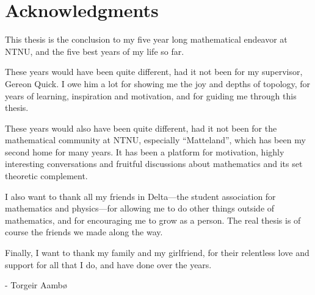 

\section{Acknowledgments}

This thesis is the conclusion to my five year long mathematical endeavor at NTNU, and the five best years of my life so far. 

These years would have been quite different, had it not been for my supervisor, Gereon Quick. I owe him a lot for showing me the joy and depths of topology, for years of learning, inspiration and motivation, and for guiding me through this thesis. 

These years would also have been quite different, had it not been for the mathematical community at NTNU, especially ``Matteland'', which has been my second home for many years. It has been a platform for motivation, highly interesting conversations and fruitful discussions about mathematics and its set theoretic complement. 

I also want to thank all my friends in Delta---the student association for mathematics and physics---for allowing me to do other things outside of mathematics, and for encouraging me to grow as a person. The real thesis is of course the friends we made along the way. 

Finally, I want to thank my family and my girlfriend, for their relentless love and support for all that I do, and have done over the years. 

\hspace{\fill} - Torgeir Aambø